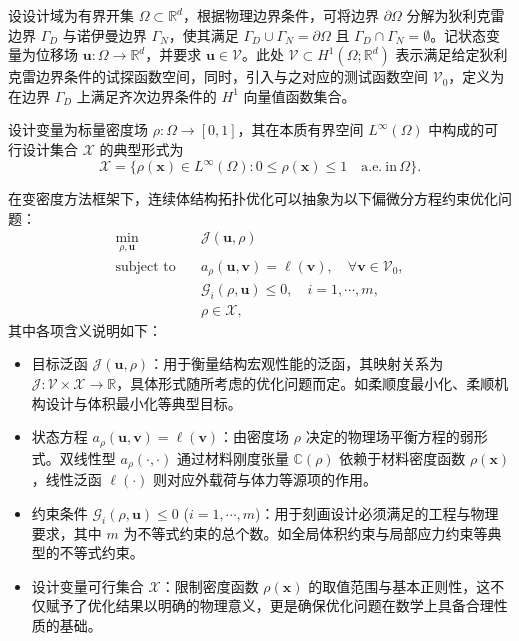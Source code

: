 设设计域为有界开集 $\Omega\subset\mathbb{R}^d$，根据物理边界条件，可将边界 $\partial\Omega$ 分解为狄利克雷边界 $\Gamma_D$ 与诺伊曼边界 $\Gamma_N$，使其满足  $\Gamma_D \cup \Gamma_N = \partial\Omega$  且 $\Gamma_D \cap \Gamma_N = \emptyset$。记状态变量为位移场 $\boldsymbol{u}:\Omega\to\mathbb{R}^d$，并要求 $\boldsymbol{u} \in \mathcal{V}$。此处 $\mathcal{V} \subset H^1(\Omega;\mathbb{R}^d)$ 表示满足给定狄利克雷边界条件的试探函数空间，同时，引入与之对应的测试函数空间 $\mathcal{V}_0$，定义为在边界 $\Gamma_D$ 上满足齐次边界条件的 $H^1$ 向量值函数集合。

设计变量为标量密度场 $\rho:\Omega\to[0,1]$，其在本质有界空间 $L^\infty(\Omega)$ 中构成的可行设计集合 $\mathcal{X}$ 的典型形式为
\[
\mathcal{X} = \{\rho(\boldsymbol{x})\in{L}^\infty(\Omega):0\leq\rho(\boldsymbol{x})\le1\quad\text{a.e.}~\text{in}\,\Omega\}.
\]

在变密度方法框架下，连续体结构拓扑优化可以抽象为以下偏微分方程约束优化问题：
\begin{equation} \label{eq:ch6_general_topology_optimization}
	\begin{aligned}
		\min_{\rho,\boldsymbol{u}}\quad&\mathcal{J}(\boldsymbol{u}, \rho)\\
		\text{subject~to}\quad&
		a_\rho(\boldsymbol{u},\boldsymbol{v}) = \ell(\boldsymbol{v}),\quad\forall\boldsymbol{v}\in\mathcal{V}_0,\\
		&\mathcal{G}_i(\rho,\boldsymbol{u})\leq0,\quad{i}=1,\cdots,m,\\
		&\rho\in\mathcal{X},
	\end{aligned}
\end{equation}
其中各项含义说明如下：
\begin{itemize}
	\item 目标泛函 $\mathcal{J}(\boldsymbol{u}, \rho)$：用于衡量结构宏观性能的泛函，其映射关系为 $\mathcal{J}:\mathcal{V}\times\mathcal{X}\to\mathbb{R}$，具体形式随所考虑的优化问题而定。如柔顺度最小化、柔顺机构设计与体积最小化等典型目标。

	\item 状态方程 $a_\rho(\boldsymbol{u},\boldsymbol{v}) = \ell(\boldsymbol{v})$：由密度场 $\rho$ 决定的物理场平衡方程的弱形式。双线性型 $a_\rho(\cdot,\cdot)$ 通过材料刚度张量 $\mathbb{C}(\rho)$ 依赖于材料密度函数 $\rho(\boldsymbol{x})$，线性泛函 $\ell(\cdot)$ 则对应外载荷与体力等源项的作用。
	
	\item 约束条件 $\mathcal{G}_i(\rho,\boldsymbol{u})\leq 0$ ($i=1,\cdots,m$)：用于刻画设计必须满足的工程与物理要求，其中 $m$ 为不等式约束的总个数。如全局体积约束与局部应力约束等典型的不等式约束。
	
	\item 设计变量可行集合 $\mathcal{X}$：限制密度函数 $\rho(\boldsymbol{x})$ 的取值范围与基本正则性，这不仅赋予了优化结果以明确的物理意义，更是确保优化问题在数学上具备合理性质的基础。
\end{itemize}


